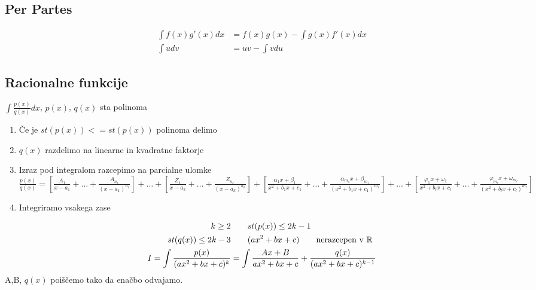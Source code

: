 \documentclass[a4paper,oneside,8pt]{extarticle}
\theoremstyle{definition}
\newcommand{\R}{\ensuremath{\mathbb{R}}}
\renewcommand{\phi}{\varphi}
\newcommand\ogl[1]{\left[#1\right]}
\begin{document}
\begin{multicols}{2}
	\subsection*{Per Partes}
	\begin{align*}
		\int f(x)g'(x)dx &= f(x)g(x) - \int g(x)f'(x)dx\\
		\int udv &= uv - \int vdu
	\end{align*}
%
	\subsection*{Racionalne funkcije}
	$\int\frac{p(x)}{q(x)}dx$, \qquad $p(x)$, $q(x)$ sta polinoma
	\begin{enumerate}
		\item Če je $st(p(x)) <= st(p(x))$ polinoma delimo
		\item $q(x)$ razdelimo na linearne in kvadratne faktorje
		\item Izraz pod integralom razcepimo na parcialne ulomke\\
		$\frac{p(x)}{q(x)} = \ogl{\frac{A_1}{x-a_1} + \dots + \frac{A_{n_1}}{(x-a_1)^{{n_1}}} } + \dots +
		\ogl{\frac{Z_1}{x-a_k}+ \dots + \frac{Z_{n_k}}{(x-a_k)^{{n_k}}} } + 
		\ogl{\frac{\alpha_1x + \beta_1}{x^2 + b_1x + c_1} + \dots + \frac{\alpha_{m_1}x + \beta_{m_1}}{(x^2 + b_1x +c_1)^{m_1}} } + \dots + 
		\ogl{\frac{\phi_1x + \omega_1}{x^2 + b_lx + c_l} + \dots + \frac{\phi_{m_l}x + \omega_{m_l}}{(x^2 + b_lx +c_l)^{m_l}} }$
		\item Integriramo vsakega zase
	\end{enumerate}
%	
	\begin{align*}
		k \geq 2 & \qquad st(p(x)) \leq 2k - 1\\
		st(q(x)) \leq 2k - 3 & \qquad (ax^2 + bx + c) \qquad \text{nerazcepen v \R}\\
		I = \int \frac{p(x)}{(ax^2 + bx + c)^k} &= \int \frac{Ax+B}{ax^2 + bx + c} + \frac{q(x)}{(ax^2 + bx + c)^{k-1}}
	\end{align*}
	A,B, $q(x)$ poiščemo tako da enačbo odvajamo.
%

\end{multicols}
\end{document}
